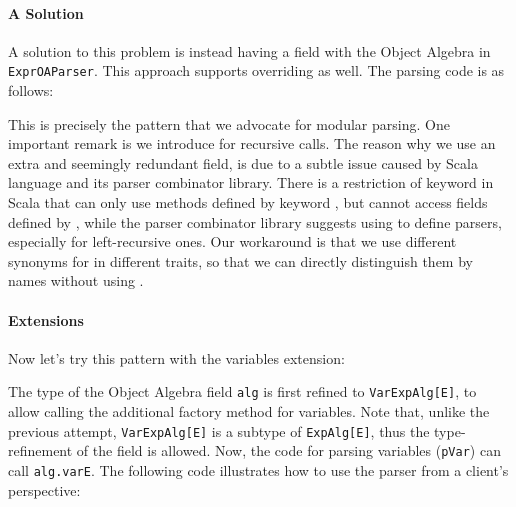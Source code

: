 
\paragraph{A Solution}
A solution to this problem is instead having a field with the Object Algebra
in \lstinline{ExprOAParser}. This approach supports overriding as well.
The parsing code is as follows:

This is precisely the pattern that we advocate for modular parsing.
One important remark is we introduce  for recursive calls.
The reason why we use an extra and seemingly redundant field, is due to a subtle issue caused by Scala language and its parser combinator library. There is a restriction of  keyword in Scala that  can only use methods defined by keyword , but cannot access fields defined by , while the parser combinator library suggests using  to define parsers, especially for left-recursive ones. Our workaround is that we use different synonyms for  in different traits, so that we can directly distinguish them by names without using .

\paragraph{Extensions}
Now let's try this pattern with the variables extension:


\noindent The type of the Object Algebra field \lstinline{alg} is first refined
to \lstinline{VarExpAlg[E]}, to allow calling the additional factory method
for variables. Note that, unlike the previous attempt, \lstinline{VarExpAlg[E]}
is a subtype of \lstinline{ExpAlg[E]}, thus the type-refinement of the
field is allowed. Now, the code for parsing variables (\lstinline{pVar}) can
call \lstinline{alg.varE}. The following code illustrates how to use
the parser from a client's perspective:


